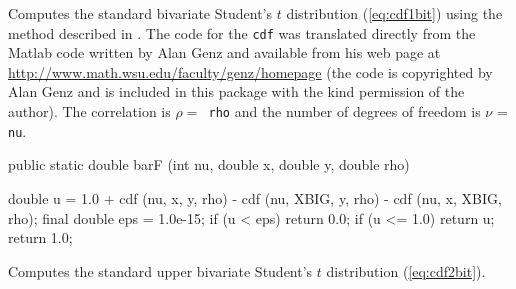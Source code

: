 \begin{code}
\begin{hide}
{      } else {
         qhrk = Math.sqrt( dh*dh + dk*dk - 2.*rho*dh*dk + nu*ors);
         hkrn = dh*dk + rho*nu; hkn = dh*dk - nu; hpk = dh + dk;
         bvt = Math.atan2( -Math.sqrt(nu)*(hkn*qhrk+hpk*hkrn),
                            hkn*hkrn-nu*hpk*qhrk )/tpi;
         if (bvt < -10.*eps)
            bvt = bvt + 1;
         gmph = dh/( tpi*Math.sqrt(nu)*( 1. + dh*dh/nu));
         gmpk = dk/( tpi*Math.sqrt(nu)*( 1. + dk*dk/nu));
         btnckh = Math.sqrt( xnkh ); btpdkh = btnckh;
         btnchk = Math.sqrt( xnhk ); btpdhk = btnchk;
         for (j = 1; j <=  (nu - 1)/2; ++j) {
            bvt = bvt + gmph*( 1. + ks*btnckh );
            bvt = bvt + gmpk*( 1. + hs*btnchk );
            btpdkh = (2*j-1)*btpdkh*( 1. - xnkh )/(2*j);
            btnckh = btnckh + btpdkh;
            btpdhk = (2*j-1)*btpdhk*( 1. - xnhk )/(2*j);
            btnchk = btnchk + btpdhk;
            gmph = gmph*j/(( j + 0.5 )*( 1. + dh*dh/nu));
            gmpk = gmpk*j/(( j + 0.5 )*( 1. + dk*dk/nu));
         }
      }
      return bvt;
   }\end{hide}
\end{code}
\begin{tabb}
   Computes the standard bivariate Student's $t$ distribution (\ref{eq:cdf1bit})
   using the method described in \cite{tGEN04a}. The code for the \texttt{cdf}
  was translated directly from the Matlab code written by Alan Genz
  and available from his web page at
  \url{http://www.math.wsu.edu/faculty/genz/homepage}
  (the code is copyrighted by Alan Genz
  and is included in this package with the kind permission of the author).
  The correlation is $\rho = $\texttt{ rho} and the number of
  degrees of freedom is $\nu$ = \texttt{nu}.
\end{tabb}
\begin{code}

   public static double barF (int nu, double x, double y, double rho) \begin{hide}
   {
      double u = 1.0 + cdf (nu, x, y, rho) - cdf (nu, XBIG, y, rho) -
                 cdf (nu, x, XBIG, rho);
      final double eps = 1.0e-15;
      if (u < eps) return 0.0;
      if (u <= 1.0) return u;
      return 1.0;
    }\end{hide}
\end{code}
 \begin{tabb} Computes the standard upper bivariate Student's $t$ distribution
   (\ref{eq:cdf2bit}).
 \end{tabb}
